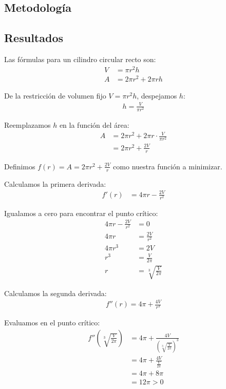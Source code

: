 \documentclass{article}
\begin{document}
\subsection{Metodología}

\subsection{Resultados}
\setcounter{equation}{0}

Las fórmulas para un cilindro circular recto son:
\begin{align}
V &= \pi r^2 h \\
A &= 2\pi r^2 + 2\pi rh
\end{align}

De la restricción de volumen fijo $V = \pi r^2 h$, despejamos $h$:
\begin{align}
h = \frac{V}{\pi r^2}
\end{align}

Reemplazamos $h$ en la función del área:
\begin{align}
A &= 2\pi r^2 + 2\pi r \cdot \frac{V}{\pi r^2} \\
&= 2\pi r^2 + \frac{2V}{r}
\end{align}

Definimos $f(r) = A = 2\pi r^2 + \frac{2V}{r}$ como nuestra función a minimizar.

Calculamos la primera derivada:
\begin{align}
f'(r) &= 4\pi r - \frac{2V}{r^2}
\end{align}

Igualamos a cero para encontrar el punto crítico:
\begin{align}
4\pi r - \frac{2V}{r^2} &= 0 \\
4\pi r &= \frac{2V}{r^2} \\
4\pi r^3 &= 2V \\
r^3 &= \frac{V}{2\pi} \\
r &= \sqrt[3]{\frac{V}{2\pi}}
\end{align}

Calculamos la segunda derivada:
\begin{align}
f''(r) = 4\pi + \frac{4V}{r^3}
\end{align}

Evaluamos en el punto crítico:
\begin{align}
f''\left(\sqrt[3]{\frac{V}{2\pi}}\right) &= 4\pi + \frac{4V}{\left(\sqrt[3]{\frac{V}{2\pi}}\right)^3} \\
&= 4\pi + \frac{4V}{\frac{V}{2\pi}} \\
&= 4\pi + 8\pi \\
&= 12\pi > 0
\end{align}
\end{document}
